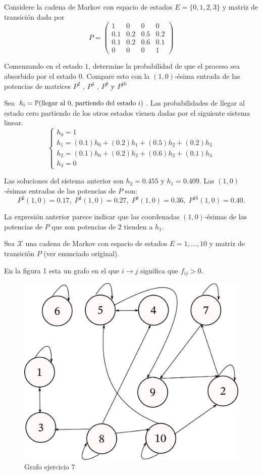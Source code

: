 \documentclass{scrartcl}
\begin{document}
\setcounter{exer}{8}
\exercise
Considere la cadena de Markov con espacio de estados 
$E = \{0, 1, 2, 3\}$ y matriz de transición dada por
\[
	P = \begin{pmatrix}
		1 & 0 & 0 & 0\\
		0.1 & 0.2 & 0.5 & 0.2\\
		0.1 & 0.2 & 0.6 & 0.1\\
		0 & 0 & 0 & 1
	\end{pmatrix}	
\]

Comenzando en el estado $1$, determine la probabilidad de que el proceso sea absorbido por el estado
$0$. Compare esto con la $(1, 0)$-ésima entrada de las potencias de matrices $P^2$ , $P^4$ , $P^8$ y $P^{16}$

\clearpage
\solution
Sea $h_i = \mathbb{P}(\text{llegar al 0, partiendo del estado $i$})$.
Las probabilidades de llegar al estado cero partiendo de los otros estados
vienen dadas por el siguiente sistema linear.
\[
	\begin{cases}
		h_0 = 1\\
		h_1 = (0.1)h_0 + (0.2)h_1 + (0.5)h_2 + (0.2)h_3\\
		h_2 = (0.1)h_0 + (0.2)h_2 + (0.6)h_2 + (0.1)h_3\\
		h_3 = 0
	\end{cases}	
\]

Las soluciones del sistema anterior son $h_2=0.455$ y $h_1 = 0.409$.
Las $(1,0)$-ésimas entradas de las potencias de $P$ son:
\[P^2(1,0) = 0.17,\; P^4(1,0) = 0.27,\; P^8(1,0) = 0.36,\; P^{16}(1,0) = 0.40.\]

La expresión anterior parece indicar que las coordenadas  $(1,0)$-ésimas
de las potencias de $P$ que son potencias de $2$ tienden a $h_1$.

\setcounter{exer}{6}
\exercise
Sea $\mathcal{X}$ una cadena de Markov con espacio de estados 
$E = {1,\dots,10}$ y matriz de transición $P$ (ver enunciado original).

\solution
En la figura 1 esta un grafo en el que $i\rightarrow j$ significa que $f_{ij}>0$.

\begin{figure}
	\includegraphics[width=\textwidth]{fig1.png}
	\caption{Grafo ejercicio 7}
\end{figure}


\end{document}
